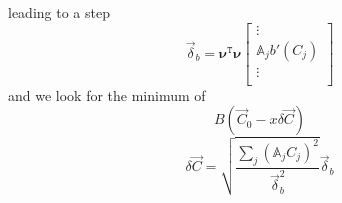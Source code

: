 \documentclass[aps,12pt]{revtex4}
\newcommand{\trn}[1]{{#1}^{\mathtt{T}}}
\begin{document}
leading to a step
\begin{equation}
	\vec{\delta}_b= \trn{\bm{\nu}} \bm{\nu}
		 \begin{bmatrix}
		\vdots\\
		\mathbb{A}_j b'(C_j)\\
		\vdots\\
	\end{bmatrix}
\end{equation}
and we look for the minimum of
\begin{equation}
	B\left(\vec{C}_0 - x \delta\vec{C}\right)
\end{equation}
 \begin{equation}
	\delta\vec{C} = \sqrt{\dfrac{\sum_j \left(\mathbb{A}_j  C_j\right)^2}{\vec{\delta}_b^2}} \vec{\delta}_b
\end{equation}
\end{document}
